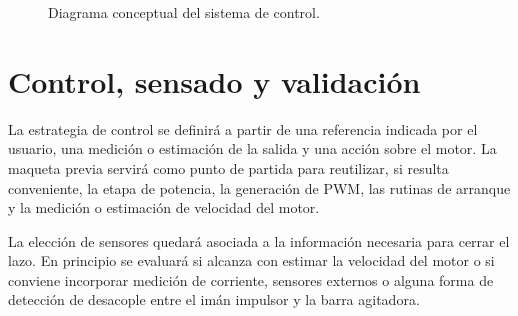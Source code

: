 \documentclass[12pt,a4paper]{article}
\begin{document}
\begin{figure}[ht]
    \centering
    \caption{Diagrama conceptual del sistema de control.}
\end{figure}

\section{Control, sensado y validación}

La estrategia de control se definirá a partir de una referencia indicada por el usuario, una medición o estimación de la salida y una acción sobre el motor. La maqueta previa servirá como punto de partida para reutilizar, si resulta conveniente, la etapa de potencia, la generación de PWM, las rutinas de arranque y la medición o estimación de velocidad del motor.

La elección de sensores quedará asociada a la información necesaria para cerrar el lazo. En principio se evaluará si alcanza con estimar la velocidad del motor o si conviene incorporar medición de corriente, sensores externos o alguna forma de detección de desacople entre el imán impulsor y la barra agitadora.
\end{document}
